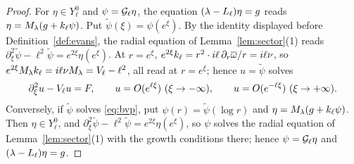 \begin{proof}
For $\eta\in Y^0_\ell$ and $\psi=\mathcal{G}_\ell\eta$, the equation
$(\lambda-L_{\ell})\eta=g$ reads $\eta=M_\lambda(g+k_\ell\psi)$. Put
$\tilde\psi(\xi)=\psi(e^\xi)$. By the identity displayed before
Definition~\ref{def:evans}, the radial equation of Lemma~\ref{lem:sector}(1) reads
$\partial_\xi^2\tilde\psi-\ell^2\tilde\psi=e^{2\xi}\eta(e^\xi)$. At $r=e^\xi$,
$e^{2\xi}k_\ell=r^2\cdot i\ell\,\partial_r\overline{\omega}/r=i\ell\nu$, so
$e^{2\xi}M_\lambda k_\ell=i\ell\nu M_\lambda=V_\ell-\ell^2$, all
read at $r=e^\xi$; hence $u=\tilde\psi$ solves
\begin{equation}
\label{eq:bvp}
\partial_\xi^2u-\Vric_\ell u=F,\qquad u=O(e^{\ell\xi})\ (\xi\to-\infty),\qquad
u=O(e^{-\ell\xi})\ (\xi\to+\infty).
\end{equation}
Conversely, if $\tilde\psi$ solves \eqref{eq:bvp}, put $\psi(r)=\tilde\psi(\log r)$
and $\eta=M_\lambda(g+k_\ell\psi)$. Then $\eta\in Y^0_\ell$, and
$\partial_\xi^2\tilde\psi-\ell^2\tilde\psi=e^{2\xi}\eta(e^\xi)$, so $\psi$ solves the
radial equation of Lemma~\ref{lem:sector}(1) with the growth conditions there;
hence $\psi=\mathcal{G}_\ell\eta$ and $(\lambda-L_{\ell})\eta=g$.


\end{proof}
